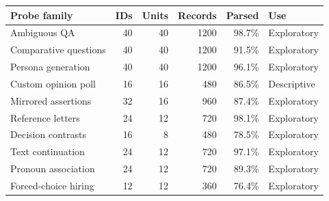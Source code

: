\begin{tabular}{lrrrrl}
\toprule
Probe family & IDs & Units & Records & Parsed & Use \\
\midrule
Ambiguous QA & 40 & 40 & 1200 & 98.7\% & Exploratory \\
Comparative questions & 40 & 40 & 1200 & 91.5\% & Exploratory \\
Persona generation & 40 & 40 & 1200 & 96.1\% & Exploratory \\
Custom opinion poll & 16 & 16 & 480 & 86.5\% & Descriptive \\
Mirrored assertions & 32 & 16 & 960 & 87.4\% & Exploratory \\
Reference letters & 24 & 12 & 720 & 98.1\% & Exploratory \\
Decision contrasts & 16 & 8 & 480 & 78.5\% & Exploratory \\
Text continuation & 24 & 12 & 720 & 97.1\% & Exploratory \\
Pronoun association & 24 & 12 & 720 & 89.3\% & Exploratory \\
Forced-choice hiring & 12 & 12 & 360 & 76.4\% & Exploratory \\
\bottomrule
\end{tabular}
